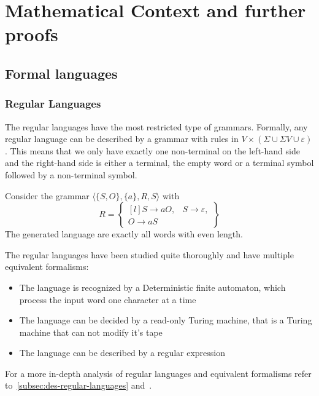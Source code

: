 \chapter{Mathematical Context and further proofs}\label{ch:mathematical-context-and-further-proofs}

\section{Formal languages}\label{sec:formal-languages-app}

\subsection{Regular Languages}\label{subsec:regular-languages}

The regular languages have the most restricted type of grammars.
Formally, any regular language can be described by a grammar with rules in $V\times(\Sigma \cup \Sigma V \cup \varepsilon)$.
This means that we only have exactly one non-terminal on the left-hand side and the right-hand side is either a terminal, the empty word or a terminal symbol followed by a non-terminal symbol.

\begin{exmp}
    Consider the grammar $\langle \{S, O\}, \{a\}, R, S \rangle$ with
    \[
        R = \begin{Bmatrix*}[l]
                S \to aO,
                &S \to \varepsilon, \\
                O \to aS
        \end{Bmatrix*}
    \]
    The generated language are exactly all words with even length.
\end{exmp}

The regular languages have been studied quite thoroughly and have multiple equivalent formalisms:
\begin{itemize}
    \setlength\itemsep{0.2em}
    \item The language is recognized by a Deterministic finite automaton, which process the input word one character at a time
    \item The language can be decided by a read-only Turing machine, that is a Turing machine that can not modify it's tape
    \item The language can be described by a regular expression
\end{itemize}

For a more in-depth analysis of regular languages and equivalent formalisms refer to~\cref{subsec:des-regular-languages} and~\cite{Straubing1994}.

